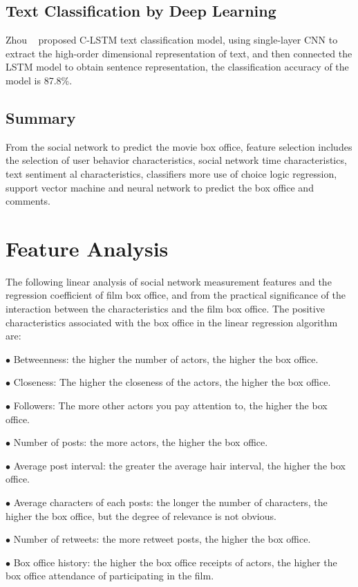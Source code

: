 \documentclass[review]{cvpr}
\begin{document}
\subsection{Text Classification by Deep Learning}

Zhou \etal~\cite{zhou2015c} proposed C-LSTM text classification model, using single-layer CNN to extract the high-order dimensional representation of text, and then connected the LSTM model to obtain sentence representation, the classification accuracy of the model is 87.8\%.

\subsection{Summary}

From the social network to predict the movie box office, feature selection includes the selection of user behavior characteristics, social network time characteristics, text sentiment al characteristics, classifiers more use of choice logic regression, support vector machine and neural network to predict the box office and comments.


\section{Feature Analysis}

The following linear analysis of social network measurement features and the regression coefficient of film box office, and from the practical significance of the interaction between the characteristics and the film box office.
The positive characteristics associated with the box office in the linear regression algorithm are:
\par$\bullet$ Betweenness: the higher the number of actors, the higher the box office.
\par$\bullet$ Closeness: The higher the closeness of the actors, the higher the box office.
\par$\bullet$ Followers: The more other actors you pay attention to, the higher the box office.
\par$\bullet$ Number of posts: the more actors, the higher the box office.
\par$\bullet$ Average post interval: the greater the average hair interval, the higher the box office.
\par$\bullet$ Average characters of each posts: the longer the number of characters, the higher the box office, but the degree of relevance is not obvious.
\par$\bullet$ Number of retweets: the more retweet posts, the higher the box office.
\par$\bullet$ Box office history: the higher the box office receipts of actors, the higher the box office attendance of participating in the film.
\end{document}
